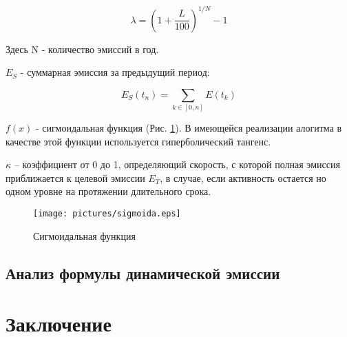 \documentclass[a4paper,12pt]{article}
\begin{document}
$$
    \lambda = (1 + \frac{L}{100})^{1/N}-1
$$

Здесь N - количество эмиссий в год.

$E_S$ - суммарная эмиссия за предыдущий период:

$$
    E_S(t_n) = \sum_{k \in [0, n]}{E(t_k)}
$$

$f(x)$ - сигмоидальная функция (Рис. \ref{fig:sigmoida}). В имеющейся реализации алогитма в качестве этой функции используется гиперболический тангенс.

$\kappa$ -- коэффициент от 0 до 1, определяющий скорость, с которой полная эмиссия приближается к целевой эмиссии $E_T$, в случае, если активность остается но одном уровне на протяжении длительного срока.

\begin{figure}[h]
      \texttt{[image: pictures/sigmoida.eps]}
      \caption{Сигмоидальная функция}
      \label{fig:sigmoida}
\end{figure}

\subsection{Анализ формулы динамической эмиссии}






\section{Заключение}
\end{document}
